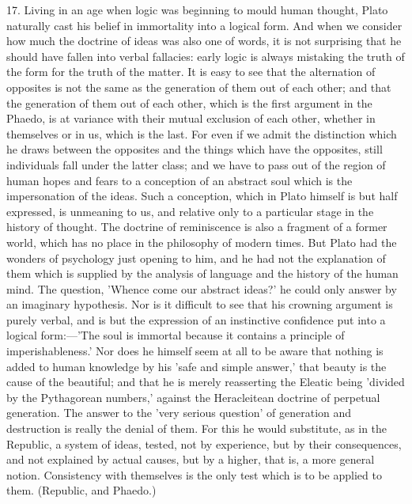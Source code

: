 17. Living in an age when logic was beginning to mould human thought,
Plato naturally cast his belief in immortality into a logical form. And
when we consider how much the doctrine of ideas was also one of words, it
is not surprising that he should have fallen into verbal fallacies: early
logic is always mistaking the truth of the form for the truth of the
matter. It is easy to see that the alternation of opposites is not the
same as the generation of them out of each other; and that the generation
of them out of each other, which is the first argument in the Phaedo, is
at variance with their mutual exclusion of each other, whether in
themselves or in us, which is the last. For even if we admit the
distinction which he draws between the opposites and the things which have
the opposites, still individuals fall under the latter class; and we have
to pass out of the region of human hopes and fears to a conception of an
abstract soul which is the impersonation of the ideas. Such a conception,
which in Plato himself is but half expressed, is unmeaning to us, and
relative only to a particular stage in the history of thought. The
doctrine of reminiscence is also a fragment of a former world, which has
no place in the philosophy of modern times. But Plato had the wonders of
psychology just opening to him, and he had not the explanation of them
which is supplied by the analysis of language and the history of the human
mind. The question, 'Whence come our abstract ideas?' he could only answer
by an imaginary hypothesis. Nor is it difficult to see that his crowning
argument is purely verbal, and is but the expression of an instinctive
confidence put into a logical form:—'The soul is immortal because it
contains a principle of imperishableness.' Nor does he himself seem at all
to be aware that nothing is added to human knowledge by his 'safe and
simple answer,' that beauty is the cause of the beautiful; and that he is
merely reasserting the Eleatic being 'divided by the Pythagorean numbers,'
against the Heracleitean doctrine of perpetual generation. The answer to
the 'very serious question' of generation and destruction is really the
denial of them. For this he would substitute, as in the Republic, a system
of ideas, tested, not by experience, but by their consequences, and not
explained by actual causes, but by a higher, that is, a more general
notion. Consistency with themselves is the only test which is to be
applied to them. (Republic, and Phaedo.)

